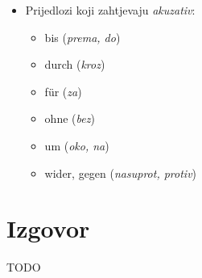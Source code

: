 \documentclass[12pt,german]{article}
\newcommand{\prijevod}[2]{\item #1 (\emph{#2})}
\begin{document}
\begin{multicols}{2}
\begin{itemize}
  \item Prijedlozi koji zahtjevaju \emph{akuzativ}:
  \begin{itemize}[nolistsep, label={}]
      \prijevod{bis}{prema, do}
      \prijevod{durch}{kroz}
      \prijevod{f\"ur}{za}
      \prijevod{ohne}{bez}
      \prijevod{um}{oko, na}
      \prijevod{wider, gegen}{nasuprot, protiv}
  \end{itemize}
\end{itemize}

\section{Izgovor}
TODO
% 

\end{multicols}
\end{document}
